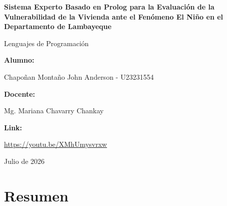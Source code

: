 \documentclass[12pt, letterpaper]{article}
\begin{document}
\begin{titlepage} \thispagestyle{fancy} \fancyfoot{}
    \centering
    \vspace*{1cm}
    
    {\Large\bfseries Sistema Experto Basado en Prolog para la Evaluación de la Vulnerabilidad de la Vivienda ante el Fenómeno El Niño en el Departamento de Lambayeque\par}
    
    \vspace{2cm}
    
    {\large Lenguajes de Programación\par}
    
    \vspace{2cm}
    
    {\normalsize\bfseries Alumno:\par}
    {Chapoñan Montaño John Anderson - U23231554\par}
    
    \vspace{2cm}
    
    {\normalsize\bfseries Docente:\par}
    {Mg. Mariana Chavarry Chankay\par}

    \vspace{2cm}
    
    {\normalsize\bfseries Link:\par}
    \url{https://youtu.be/XMhUmysvrxw}
    
    \vspace{2cm}
    \vfill
    
    {Julio de 2026\par}
    \vspace{1cm}
    
\end{titlepage}

\newpage
{} %
\section*{\centering\bfseries Resumen}
\end{document}
